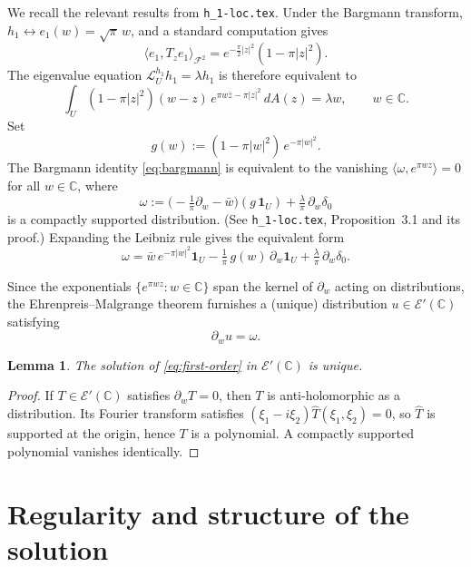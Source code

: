 \documentclass[11pt]{article}
\newtheorem{lemma}[theorem]{Lemma}
\newcommand{\C}{\mathbb C}
\newcommand{\1}{\mathbf 1}
\newcommand{\pw}{\partial_w}
\begin{document}
We recall the relevant results from \texttt{h\_1-loc.tex}. Under the Bargmann transform,
\(h_1\leftrightarrow e_1(w)=\sqrt\pi\,w\), and a standard computation gives
\[
\langle e_1,T_ze_1\rangle_{\mathcal F^2}
=e^{-\frac\pi2|z|^2}(1-\pi|z|^2).
\]
The eigenvalue equation \(\mathcal L_U^{h_1}h_1=\lambda h_1\) is therefore equivalent to
\begin{equation}\label{eq:bargmann}
\int_U(1-\pi|z|^2)(w-z)\,e^{\pi w\bar z-\pi|z|^2}\,dA(z)=\lambda w,
\qquad w\in\C.
\end{equation}
Set
\[
g(w):=(1-\pi|w|^2)\,e^{-\pi|w|^2}.
\]
The Bargmann identity \eqref{eq:bargmann} is equivalent to the vanishing
\(\langle\omega,e^{\pi wz}\rangle=0\) for all \(w\in\C\), where
\begin{equation}\label{eq:omega}
\omega
:=
\bigl(-\tfrac1\pi\pw-\bar w\bigr)(g\,\1_U)
+\tfrac\lambda\pi\,\pw\delta_0
\end{equation}
is a compactly supported distribution. (See \texttt{h\_1-loc.tex}, Proposition~3.1 and its
proof.) Expanding the Leibniz rule gives the equivalent form
\begin{equation}\label{eq:omega-expanded}
\omega
=
\bar w\,e^{-\pi|w|^2}\1_U
-\tfrac1\pi\,g(w)\,\pw\1_U
+\tfrac\lambda\pi\,\pw\delta_0.
\end{equation}

Since the exponentials \(\{e^{\pi wz}:w\in\C\}\) span the kernel of \(\pw\) acting on
distributions, the Ehrenpreis--Malgrange theorem furnishes a (unique) distribution
\(u\in\mathcal E'(\C)\) satisfying
\begin{equation}\label{eq:first-order}
\pw u=\omega.
\end{equation}

\begin{lemma}\label{lem:uniqueness}
The solution of \eqref{eq:first-order} in \(\mathcal E'(\C)\) is unique.
\end{lemma}

\begin{proof}
If \(T\in\mathcal E'(\C)\) satisfies \(\pw T=0\), then \(T\) is anti-holomorphic as a
distribution. Its Fourier transform satisfies
\((\xi_1-i\xi_2)\hat T(\xi_1,\xi_2)=0\), so \(\hat T\) is supported at the origin, hence
\(T\) is a polynomial. A compactly supported polynomial vanishes identically.
\end{proof}

\section{Regularity and structure of the solution}
\end{document}
